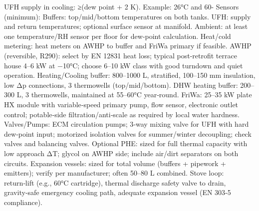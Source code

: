 \markdownRendererUlItem UFH supply in cooling: ≥(dew point + 2 K). Example: 26°C and 60- Sensors (minimum):\markdownRendererUlItemEnd 
\markdownRendererUlItem Buffers: top/mid/bottom temperatures on both tanks.\markdownRendererUlItemEnd 
\markdownRendererUlItem UFH: supply and return temperatures; optional surface sensor at manifold.\markdownRendererUlItemEnd 
\markdownRendererUlItem Ambient: at least one temperature/RH sensor per floor for dew‑point calculation.\markdownRendererUlItemEnd 
\markdownRendererUlItem Heat/cold metering: heat meters on AWHP to buffer and FriWa primary if feasible.\markdownRendererUlItemEnd 
\markdownRendererUlEndTight \markdownRendererInterblockSeparator
{}
\markdownRendererSectionEnd \markdownRendererSectionBegin
{}\markdownRendererInterblockSeparator
{}\markdownRendererUlBeginTight
\markdownRendererUlItem AWHP (reversible, R290): select by EN 12831 heat loss; typical post‑retrofit terrace house 4–6 kW at −10°C; choose 6–10 kW class with good turndown and quiet operation.\markdownRendererUlItemEnd 
\markdownRendererUlItem Heating/Cooling buffer: 800–1000 L, stratified, 100–150 mm insulation, low Δp connections, 3 thermowells (top/mid/bottom).\markdownRendererUlItemEnd 
\markdownRendererUlItem DHW heating buffer: 200–300 L, 3 thermowells, maintained at 55–60°C year‑round.\markdownRendererUlItemEnd 
\markdownRendererUlItem FriWa: 25–35 kW plate HX module with variable‑speed primary pump, flow sensor, electronic outlet control; potable‑side filtration/anti‑scale as required by local water hardness.\markdownRendererUlItemEnd 
\markdownRendererUlItem Valves/Pumps: ECM circulation pumps; 3‑way mixing valve for UFH with hard dew‑point input; motorized isolation valves for summer/winter decoupling; check valves and balancing valves.\markdownRendererUlItemEnd 
\markdownRendererUlItem Optional PHE: sized for full thermal capacity with low approach ΔT; glycol on AWHP side; include air/dirt separators on both circuits.\markdownRendererUlItemEnd 
\markdownRendererUlItem Expansion vessels: sized for total volume (buffers + pipework + emitters); verify per manufacturer; often 50–80 L combined.\markdownRendererUlItemEnd 
\markdownRendererUlEndTight \markdownRendererInterblockSeparator
{}
\markdownRendererSectionEnd \markdownRendererSectionBegin
{}\markdownRendererInterblockSeparator
{}\markdownRendererUlBeginTight
\markdownRendererUlItem Stove loop: return‑lift (e.g., 60°C cartridge), thermal discharge safety valve to drain, gravity‑safe emergency cooling path, adequate expansion vessel (EN 303‑5 compliance).\markdownRendererUlItemEnd 
